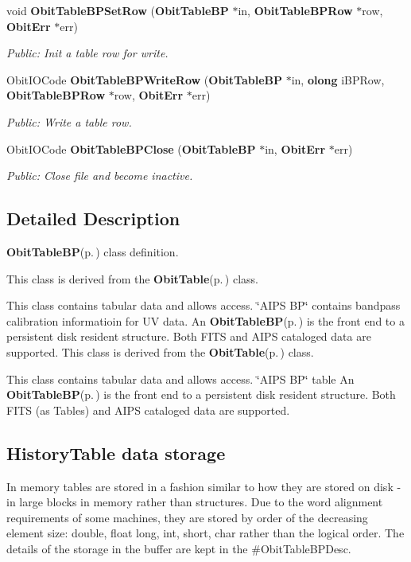 \begin{CompactItemize}
void {\bf Obit\-Table\-BPSet\-Row} ({\bf Obit\-Table\-BP} $\ast$in, {\bf Obit\-Table\-BPRow} $\ast$row, {\bf Obit\-Err} $\ast$err)
\begin{CompactList}\small\item\em Public: Init a table row for write. \item\end{CompactList}\item 
Obit\-IOCode {\bf Obit\-Table\-BPWrite\-Row} ({\bf Obit\-Table\-BP} $\ast$in, {\bf olong} i\-BPRow, {\bf Obit\-Table\-BPRow} $\ast$row, {\bf Obit\-Err} $\ast$err)
\begin{CompactList}\small\item\em Public: Write a table row. \item\end{CompactList}\item 
Obit\-IOCode {\bf Obit\-Table\-BPClose} ({\bf Obit\-Table\-BP} $\ast$in, {\bf Obit\-Err} $\ast$err)
\begin{CompactList}\small\item\em Public: Close file and become inactive. \item\end{CompactList}\end{CompactItemize}


\subsection{Detailed Description}
{\bf Obit\-Table\-BP}{\rm (p.\,\pageref{structObitTableBP})} class definition. 

This class is derived from the {\bf Obit\-Table}{\rm (p.\,\pageref{structObitTable})} class.

This class contains tabular data and allows access. \char`\"{}AIPS BP\char`\"{} contains bandpass calibration informatioin for UV data. An {\bf Obit\-Table\-BP}{\rm (p.\,\pageref{structObitTableBP})} is the front end to a persistent disk resident structure. Both FITS and AIPS cataloged data are supported. This class is derived from the {\bf Obit\-Table}{\rm (p.\,\pageref{structObitTable})} class.

This class contains tabular data and allows access. \char`\"{}AIPS BP\char`\"{} table An {\bf Obit\-Table\-BP}{\rm (p.\,\pageref{structObitTableBP})} is the front end to a persistent disk resident structure. Both FITS (as Tables) and AIPS cataloged data are supported.\subsection{History\-Table data storage}\label{ObitTableWX_8h_TableDataStorage}
In memory tables are stored in a fashion similar to how they are stored on disk - in large blocks in memory rather than structures. Due to the word alignment requirements of some machines, they are stored by order of the decreasing element size: double, float long, int, short, char rather than the logical order. The details of the storage in the buffer are kept in the \#Obit\-Table\-BPDesc.

